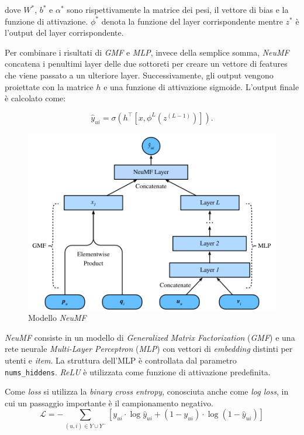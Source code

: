 dove $W^*$, $b^*$ e $\alpha^*$ sono rispettivamente la matrice dei pesi, il vettore di bias e la funzione di attivazione. $\phi^*$ denota la funzione del layer corrispondente mentre $z^*$ è l'output del layer corrispondente.

Per combinare i risultati di \textit{GMF} e \textit{MLP}, invece della semplice somma, \textit{NeuMF} concatena i penultimi layer delle due sottoreti per creare un vettore di features che viene passato a un ulteriore layer. Successivamente, gli output vengono proiettate con la matrice $h$ e una funzione di attivazione sigmoide. L'output finale è calcolato come:

\[
\hat{y}_{ui} = \sigma(h^\top[x, \phi^L(z^{(L-1)})]).
\]

\begin{figure}[H]
    \centering
    \includegraphics[scale=0.6]{figures/algorithms/neu_mf.png}
    \caption{Modello \textit{NeuMF}}
    \label{fig:neu_mf}
\end{figure}

\textit{NeuMF} consiste in un modello di \textit{Generalized Matrix Factorization} (\textit{GMF}) e una rete neurale \textit{Multi-Layer Perceptron} (\textit{MLP}) con vettori di \textit{embedding} distinti per utenti e \textit{item}. La struttura dell'MLP è controllata dal parametro \\ \texttt{nums\_hiddens}. \textit{ReLU} è utilizzata come funzione di attivazione predefinita.

Come \textit{loss} si utilizza la \textit{binary cross entropy}, conosciuta anche come \textit{log loss}, in cui un passaggio importante è il campionamento negativo. 
\[
\mathcal{L} = -\sum_{(u,i) \in Y \cup Y^{-}} \left[ y_{ui} \cdot \log \hat{y}_{ui} + (1 - y_{ui}) \cdot \log(1 - \hat{y}_{ui}) \right]
\]

